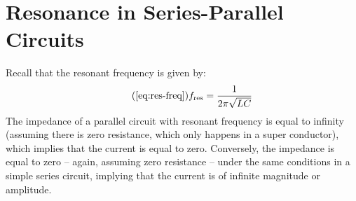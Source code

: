 \documentclass{article}
\begin{document}
	\section[Series-Parallel]{Resonance in Series-Parallel Circuits}
	Recall that the resonant frequency is given by:
	\begin{equation}\tag{\ref{eq:res-freq}}
		f_{\text{res}}=\frac{1}{2\pi \sqrt{LC}}
	\end{equation}
	The impedance of a parallel circuit with resonant frequency is equal to 
	infinity (assuming there is zero resistance, which only happens in a super 
	conductor), which implies that the current is equal to zero.  Conversely, 
	the impedance is equal to zero -- again, assuming zero resistance -- under 
	the same conditions in a simple series circuit, implying that the current 
	is of infinite magnitude or 
	amplitude.
\end{document}
